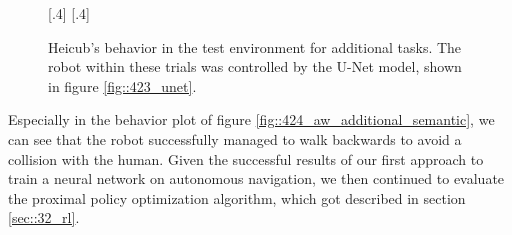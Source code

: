 \begin{figure}[h!]
	\centering
	[.4\linewidth]{}
	[.4\linewidth]{}
	\caption{Heicub's behavior in the test environment for additional tasks. The robot within these trials was controlled by the U-Net model, shown in figure \ref{fig::423_unet}.}
\label{fig::424_aw_gif_additional}
\end{figure} 
Especially in the behavior plot of figure \ref{fig::424_aw_additional_semantic}, we can see that the robot successfully managed to walk backwards to avoid a collision with the human. Given the successful results of our first approach to train a neural network on autonomous navigation, we then continued to evaluate the proximal policy optimization algorithm, which got described in section \ref{sec::32_rl}.
